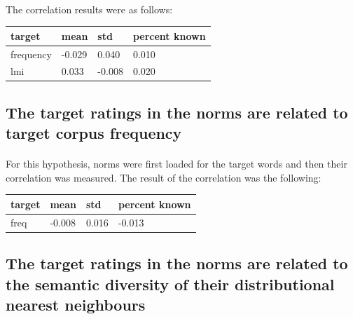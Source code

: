\documentclass[11pt,a4paper]{article}
\begin{document}
\paragraph{}
The correlation results were as follows:

\begin{table}[H]
\centering
\begin{tabular}{@{}llll@{}}
\toprule
target    & mean   & std    & percent known \\ \midrule
frequency & -0.029 & 0.040  & 0.010         \\
lmi       & 0.033  & -0.008 & 0.020         \\ \bottomrule
\end{tabular}
\end{table}

\subsection{The target ratings in the norms are related to target corpus frequency}
\paragraph{}
For this hypothesis, norms were first loaded for the target words and then their correlation was measured. The result of the correlation was the following:

\begin{table}[H]
\centering
\begin{tabular}{@{}llll@{}}
\toprule
target & mean   & std   & percent known \\ \midrule
freq   & -0.008 & 0.016 & -0.013       \\ \bottomrule
\end{tabular}
\end{table}

\subsection{The target ratings in the norms are related to the semantic diversity of their distributional nearest neighbours}
\end{document}
